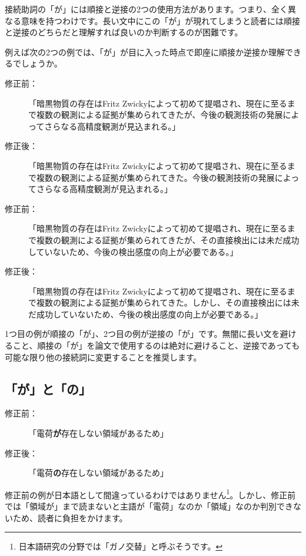 接続助詞の「が」には順接と逆接の2つの使用方法があります。つまり、全く異なる意味を持つわけです。長い文中にこの「が」が現れてしまうと読者には順接と逆接のどちらだと理解すれば良いのか判断するのが困難です。

例えば次の2つの例では、「が」が目に入った時点で即座に順接か逆接か理解できるでしょうか。

\begin{description}
\item[修正前：]「暗黒物質の存在はFritz Zwickyによって初めて提唱され、現在に至るまで複数の観測による証拠が集められてきたが、今後の観測技術の発展によってさらなる高精度観測が見込まれる。」
\item[修正後：]「暗黒物質の存在はFritz Zwickyによって初めて提唱され、現在に至るまで複数の観測による証拠が集められてきた。今後の観測技術の発展によってさらなる高精度観測が見込まれる。」
\end{description}

\begin{description}
\item[修正前：]「暗黒物質の存在はFritz Zwickyによって初めて提唱され、現在に至るまで複数の観測による証拠が集められてきたが、その直接検出には未だ成功していないため、今後の検出感度の向上が必要である。」
\item[修正後：]「暗黒物質の存在はFritz Zwickyによって初めて提唱され、現在に至るまで複数の観測による証拠が集められてきた。しかし、その直接検出には未だ成功していないため、今後の検出感度の向上が必要である。」
\end{description}

1つ目の例が順接の「が」、2つ目の例が逆接の「が」です。無闇に長い文を避けること、順接の「が」を論文で使用するのは絶対に避けること、逆接であっても可能な限り他の接続詞に変更することを推奨します。

\subsection{「が」と「の」}

\begin{description}
\item[修正前：]「電荷\textbf{が}存在しない領域があるため」
\item[修正後：]「電荷\textbf{の}存在しない領域があるため」
\end{description}

修正前の例が日本語として間違っているわけではありません\footnote{日本語研究の分野では「ガノ交替」と呼ぶそうです。}。しかし、修正前では「領域が」まで読まないと主語が「電荷」なのか「領域」なのか判別できないため、読者に負担をかけます。

